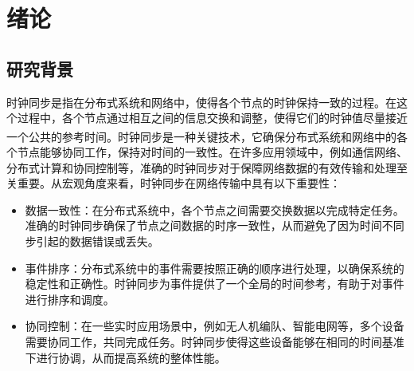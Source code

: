 \documentclass[UTF8,a4paper,12pt]{ctexart}
\numberwithin{equation}{section}
\begin{document}
	\newpage
	\renewcommand\contentsname{\textbf{目\quad录}}
	
	\begin{center}
		{
			\tableofcontents
			\newpage
			\renewcommand\listfigurename{\hfill\textbf{本文插图索引}\hfill}
			\listoffigures
			
			\newpage
			\renewcommand\listtablename{\hfill\textbf{本文表格索引}\hfill}
			\listoftables
			\thispagestyle{fancy}
		}
	\end{center}
	
	\newpage
	\section{绪论}
	\subsection{研究背景}
	时钟同步是指在分布式系统和网络中，使得各个节点的时钟保持一致的过程。在这个过程中，各个节点通过相互之间的信息交换和调整，使得它们的时钟值尽量接近一个公共的参考时间\textsuperscript{\cite{kopetz1987clock}}。时钟同步是一种关键技术，它确保分布式系统和网络中的各个节点能够协同工作，保持对时间的一致性。在许多应用领域中，例如通信网络、分布式计算和协同控制等，准确的时钟同步对于保障网络数据的有效传输和处理至关重要。从宏观角度来看，时钟同步在网络传输中具有以下重要性：
	\begin{itemize}
		\item 数据一致性：在分布式系统中，各个节点之间需要交换数据以完成特定任务。准确的时钟同步确保了节点之间数据的时序一致性，从而避免了因为时间不同步引起的数据错误或丢失。
		\item 事件排序：分布式系统中的事件需要按照正确的顺序进行处理，以确保系统的稳定性和正确性。时钟同步为事件提供了一个全局的时间参考，有助于对事件进行排序和调度。
		\item 协同控制：在一些实时应用场景中，例如无人机编队、智能电网等，多个设备需要协同工作，共同完成任务。时钟同步使得这些设备能够在相同的时间基准下进行协调，从而提高系统的整体性能。
	\end{itemize}
	
\end{document}
